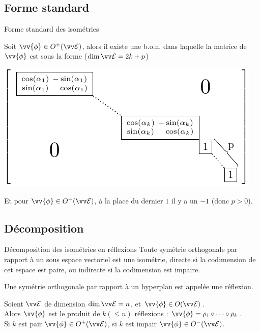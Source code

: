 \documentclass{m53beamer}
\begin{document}
\subsection{Forme standard}
\begin{frame}{Forme standard des isométries}
  \begin{proposition}
    Soit $\vv{\phi} \in O^{+}(\ev{E})$, alors il existe une b.o.n. dans laquelle la matrice de $\vv{\phi}$ est sous la forme ($\dim\ev{E} = 2k+p$)
    \begin{center}
      \includegraphics{pictures/isometrymatrix.pdf}
    \end{center}\pause
    Et pour $\vv{\phi} \in O^{-}(\ev{E})$, à la place du dernier $1$ il y a un $-1$ (donc $p>0$).
  \end{proposition}
\end{frame}

\subsection{Décomposition}
\begin{frame}{Décomposition des isométries en réflexions}
  Toute symétrie orthogonale par rapport à un sous espace vectoriel est une isométrie\pause, directe si la codimension de cet espace est paire\pause, ou indirecte si la codimension est impaire.\pause
  \begin{definition}
    Une symétrie orthogonale par rapport à un hyperplan est appelée une \alert{réflexion}.\pause\\
  \end{definition}\pause
  \begin{proposition}
    Soient $\ev{E}$ de dimension $\dim\ev{E}=n$, et $\vv{\phi} \in O(\ev{E})$.\pause\\
    Alors $\vv{\phi}$ est le produit de $k (\leq n)$ réflexions : $\vv{\phi} = \rho_{1}\circ\cdots\circ\rho_{k}$.\pause\\
    Si $k$ est pair $\vv{\phi} \in O^{+}(\ev{E})$, si $k$ est impair $\vv{\phi} \in O^{-}(\ev{E})$.
  \end{proposition}
\end{frame}
\end{document}
